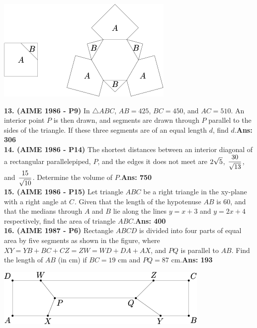 \documentclass[letterpaper,10pt,addpoints]{exam}
\begin{document}
\begin{center}
\includegraphics[scale=0.6]{AIME_1985_Problem_15.png}
\end{center}

\textbf{13. (AIME 1986 - P9) } In $\triangle ABC$, $AB= 425$, $BC=450$, and $AC=510$. An interior point $P$ is then drawn, and segments are drawn through $P$ parallel to the sides of the triangle. If these three segments are of an equal length $d$, find $d$.\quad  \textbf{Ans: 306}\\

\textbf{14. (AIME 1986 - P14) } The shortest distances between an interior diagonal of a rectangular parallelepiped, $P$, and the edges it does not meet are $\mathlarger{2\sqrt{5}}$, $\mathlarger{\frac{30}{\sqrt{13}}}$, and $\mathlarger{\frac{15}{\sqrt{10}}}$. Determine the volume of $P$.\textbf{Ans: 750}\\

\textbf{15. (AIME 1986 - P15) } Let triangle $ABC$ be a right triangle in the xy-plane with a right angle at $C_{}$. Given that the length of the hypotenuse $AB$ is $60$, and that the medians through $A$ and $B$ lie along the lines $y=x+3$ and $y=2x+4$ respectively, find the area of triangle $ABC$.\quad  \textbf{Ans: 400}\\

\textbf{16. (AIME 1987 - P6) } Rectangle $ABCD$ is divided into four parts of equal area by five segments as shown in the figure, where $XY = YB + BC + CZ = ZW = WD + DA + AX$, and $PQ$ is parallel to $AB$. Find the length of $AB$ (in cm) if $BC = 19$ cm and $PQ = 87$ cm.\quad  \textbf{Ans: 193}

\begin{center}
\includegraphics[scale=0.6]{AIME_1987_Problem_6.png}
\end{center}
\end{document}
